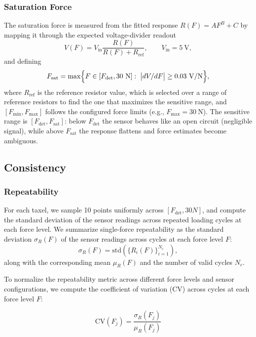 \subsubsection{Saturation Force}
The saturation force is measured from the fitted response $R(F)=AF^B+C$ by mapping it through the expected voltage-divider readout
\[
V(F)=V_{\mathrm{in}}\frac{R(F)}{R(F)+R_{\mathrm{ref}}},\qquad V_{\mathrm{in}}=5~\mathrm{V},
\]
and defining
\[
F_{\mathrm{sat}}=\max\Bigl\{F\in[F_{\mathrm{det}},30~\mathrm{N}]:\; \bigl|dV/dF\bigr|\ge 0.03~\mathrm{V/N}\Bigr\},
\]
where $R_{\mathrm{ref}}$ is the reference resistor value, which is selected over a range of reference resistors to find the one that maximizes the sensitive range, and $[F_{\min},F_{\max}]$ follows the configured force limits (e.g., $F_{\max}=30~\mathrm{N}$). The sensitive range is $[F_{\mathrm{det}},F_{\mathrm{sat}}]$: below $F_{\mathrm{det}}$ the sensor behaves like an open circuit (negligible signal), while above $F_{\mathrm{sat}}$ the response flattens and force estimates become ambiguous.




\subsection{Consistency}

\subsubsection{Repeatability}
For each taxel, we sample 10 points uniformly across $[F_{\mathrm{det}}, 30 N]$, and compute the standard deviation of the sensor readings across repeated loading cycles at each force level. We summarize single-force repeatability as the standard deviation $\sigma_R(F)$ of the sensor readings across cycles at each force level $F$:
\begin{equation}
\sigma_R(F) = \mathrm{std}\!\left(\{R_i(F)\}_{i=1}^{N_c}\right),
\end{equation}
along with the corresponding mean $\mu_R(F)$ and the number of valid cycles $N_c$.

To normalize the repeatability metric across different force levels and sensor configurations, we compute the coefficient of variation (CV) across cycles at each force level $F$:

\begin{equation}
\mathrm{CV}(F_j)=\frac{\sigma_R(F_j)}{\mu_R(F_j)}
\end{equation}

